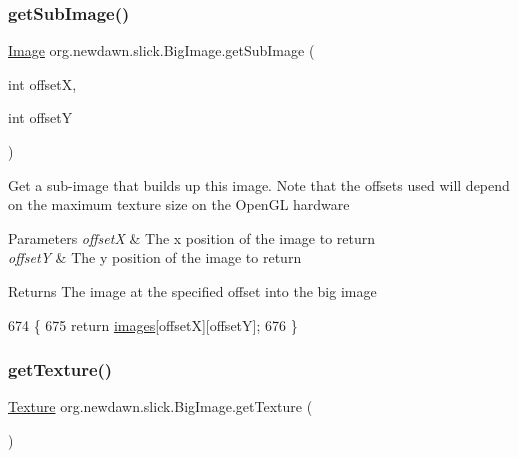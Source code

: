 \subsubsection{\texorpdfstring{get\+Sub\+Image()}{getSubImage()}\hspace{0.1cm}{\footnotesize\ttfamily [2/2]}}
{\footnotesize\ttfamily \mbox{\hyperlink{classorg_1_1newdawn_1_1slick_1_1_image}{Image}} org.\+newdawn.\+slick.\+Big\+Image.\+get\+Sub\+Image (\begin{DoxyParamCaption}\item[{int}]{offsetX,  }\item[{int}]{offsetY }\end{DoxyParamCaption})\hspace{0.3cm}{\ttfamily [inline]}}

Get a sub-\/image that builds up this image. Note that the offsets used will depend on the maximum texture size on the Open\+GL hardware


\begin{DoxyParams}{Parameters}
{\em offsetX} & The x position of the image to return \\
\hline
{\em offsetY} & The y position of the image to return \\
\hline
\end{DoxyParams}
\begin{DoxyReturn}{Returns}
The image at the specified offset into the big image 
\end{DoxyReturn}

\begin{DoxyCode}
674                                                        \{
675          \textcolor{keywordflow}{return} \mbox{\hyperlink{classorg_1_1newdawn_1_1slick_1_1_big_image_a297fc524b2aef82e75e23a59c6f4102f}{images}}[offsetX][offsetY];
676     \}
\end{DoxyCode}
\mbox{\label{classorg_1_1newdawn_1_1slick_1_1_big_image_a6b527195c6230fe44a2aed4bc24b9a04}} 
\subsubsection{\texorpdfstring{get\+Texture()}{getTexture()}}
{\footnotesize\ttfamily \mbox{\hyperlink{interfaceorg_1_1newdawn_1_1slick_1_1opengl_1_1_texture}{Texture}} org.\+newdawn.\+slick.\+Big\+Image.\+get\+Texture (\begin{DoxyParamCaption}{ }\end{DoxyParamCaption})\hspace{0.3cm}{\ttfamily [inline]}}

